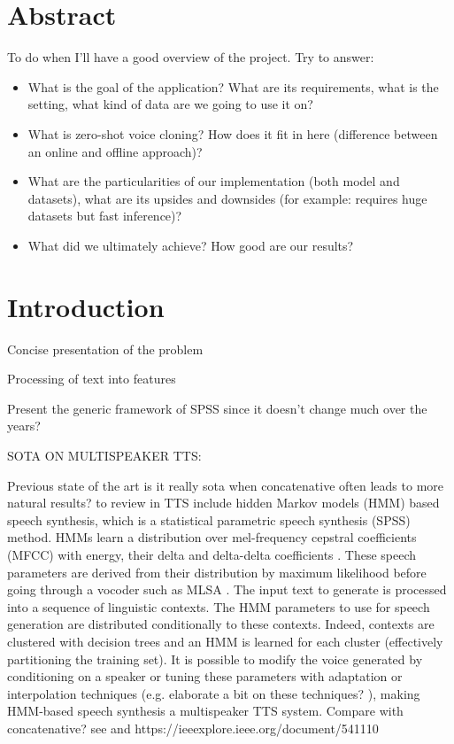 \documentclass[a4paper, oneside]{article}
\begin{document}
\section{Abstract}
\color{red}
To do when I'll have a good overview of the project. Try to answer:
\begin{itemize}
	\item What is the goal of the application? What are its requirements, what is the setting, what kind of data are we going to use it on?
	\item What is zero-shot voice cloning? How does it fit in here (difference between an online and offline approach)?
	\item What are the particularities of our implementation (both model and datasets), what are its upsides and downsides (for example: requires huge datasets but fast inference)?
	\item What did we ultimately achieve? How good are our results?
\end{itemize}
\color{black}

\section{Introduction}

\color{red}
Concise presentation of the problem

Processing of text into features

Present the generic framework of SPSS since it doesn't change much over the years?

SOTA ON MULTISPEAKER TTS:

\color{black}
Previous state of the art \color{red} is it really sota when concatenative often leads to more natural results? to review \color{black} in TTS include hidden Markov models (HMM) based speech synthesis, which is a statistical parametric speech synthesis (SPSS) method. HMMs learn a distribution over mel-frequency cepstral coefficients (MFCC) with energy, their delta and delta-delta coefficients \cite{TTSSOTA}. These speech parameters are derived from their distribution by maximum likelihood before going through a vocoder such as MLSA \cite{MLSA}. The input text to generate is processed into a sequence of linguistic contexts. The HMM parameters to use for speech generation are distributed conditionally to these contexts. Indeed, contexts are clustered with decision trees and an HMM is learned for each cluster \cite{HMMTTS} (effectively partitioning the training set). It is possible to modify the voice generated by conditioning on a speaker or tuning these parameters with adaptation or interpolation techniques (e.g. \cite{HMMSpeakerInterpolation}  \color{red} elaborate a bit on these techniques? \color{black}), making HMM-based speech synthesis a multispeaker TTS system. \color{red} Compare with concatenative? see \cite{SPSSDNN} and https://ieeexplore.ieee.org/document/541110 \color{black}
\end{document}
